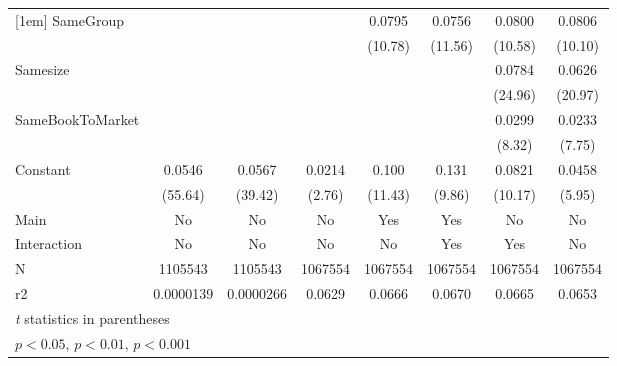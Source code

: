 {\begin{tabular}{l*{7}{c}}
[1em]
SameGroup           &                     &                     &                     &      0.0795\sym{***}&      0.0756\sym{***}&      0.0800\sym{***}&      0.0806\sym{***}\\
                    &                     &                     &                     &     (10.78)         &     (11.56)         &     (10.58)         &     (10.10)         \\
[1em]
Samesize            &                     &                     &                     &                     &                     &      0.0784\sym{***}&      0.0626\sym{***}\\
                    &                     &                     &                     &                     &                     &     (24.96)         &     (20.97)         \\
[1em]
SameBookToMarket    &                     &                     &                     &                     &                     &      0.0299\sym{***}&      0.0233\sym{***}\\
                    &                     &                     &                     &                     &                     &      (8.32)         &      (7.75)         \\
[1em]
Constant            &      0.0546\sym{***}&      0.0567\sym{***}&      0.0214\sym{**} &       0.100\sym{***}&       0.131\sym{***}&      0.0821\sym{***}&      0.0458\sym{***}\\
                    &     (55.64)         &     (39.42)         &      (2.76)         &     (11.43)         &      (9.86)         &     (10.17)         &      (5.95)         \\
\hline
Main                &          No         &          No         &          No         &         Yes         &         Yes         &          No         &          No         \\
Interaction         &          No         &          No         &          No         &          No         &         Yes         &         Yes         &          No         \\
N                   &     1105543         &     1105543         &     1067554         &     1067554         &     1067554         &     1067554         &     1067554         \\
r2                  &   0.0000139         &   0.0000266         &      0.0629         &      0.0666         &      0.0670         &      0.0665         &      0.0653         \\
\hline\hline
\multicolumn{8}{l}{\footnotesize \textit{t} statistics in parentheses}\\
\multicolumn{8}{l}{\footnotesize \sym{*} \(p<0.05\), \sym{**} \(p<0.01\), \sym{***} \(p<0.001\)}\\
\end{tabular}
}

